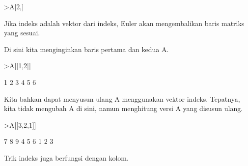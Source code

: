 \documentclass[a4paper,10pt]{article}
\begin{document}
\begin{eulernotebook}
\begin{eulercomment}
\begin{eulercomment}
\begin{eulercomment}
\begin{eulercomment}
\begin{eulercomment}
\begin{eulercomment}
\begin{eulerprompt}
>A[2,]
\end{eulerprompt}
\begin{euleroutput}
  [4,  5,  6]
\end{euleroutput}
\begin{eulercomment}
Jika indeks adalah vektor dari indeks, Euler akan mengembalikan baris
matriks yang sesuai.

Di sini kita menginginkan baris pertama dan kedua A.
\end{eulercomment}
\begin{eulerprompt}
>A[[1,2]]
\end{eulerprompt}
\begin{euleroutput}
              1             2             3 
              4             5             6 
\end{euleroutput}
\begin{eulercomment}
Kita bahkan dapat menyusun ulang A menggunakan vektor indeks.
Tepatnya, kita tidak mengubah A di sini, namun menghitung versi A yang
disusun ulang.
\end{eulercomment}
\begin{eulerprompt}
>A[[3,2,1]]
\end{eulerprompt}
\begin{euleroutput}
              7             8             9 
              4             5             6 
              1             2             3 
\end{euleroutput}
\begin{eulercomment}
Trik indeks juga berfungsi dengan kolom.


\end{eulercomment}
\end{eulercomment}
\end{eulercomment}
\end{eulercomment}
\end{eulercomment}
\end{eulercomment}
\end{eulercomment}
\end{eulernotebook}
\end{document}

